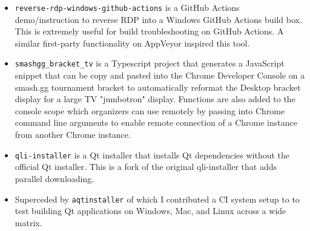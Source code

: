 \documentclass[10pt,letter,ragged2e]{altacv}
\begin{document}
\begin{paracol}{2}
\divider


\begin{itemize}
\item \texttt{reverse-rdp-windows-github-actions} is a GitHub Actions demo/instruction to reverse RDP into a Windows GitHub Actions build box. This is extremely useful for build troubleshooting on GitHub Actions. A similar first-party functionality on AppVeyor inspired this tool.
\end{itemize}

\divider


\begin{itemize}
\item \texttt{smashgg\_bracket\_tv} is a Typescript project that generates a JavaScript snippet that can be copy and pasted into the Chrome Developer Console on a smash.gg tournament bracket to automatically reformat the Desktop bracket display for a large TV "jumbotron" display. Functions are also added to the console scope which organizers can use remotely by passing into Chrome command line arguments to enable remote connection of a Chrome instance from another Chrome instance.
\end{itemize}

\divider


\begin{itemize}
\item \texttt{qli-installer} is a Qt installer that installs Qt dependencies without the official Qt installer. This is a fork of the original qli-installer that adds parallel downloading.
\item Superceded by \texttt{aqtinstaller} of which I contributed a CI system setup to to test building Qt applications on Windows, Mac, and Linux across a wide matrix.
\end{itemize}

\divider



\end{paracol}
\end{document}
